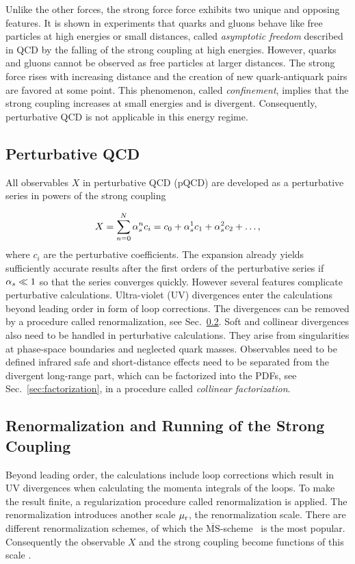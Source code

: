 Unlike the other forces, the strong force force exhibits two unique and opposing
features. It is shown in experiments that quarks and gluons behave like free
particles at high energies or small distances, called \emph{asymptotic freedom}
described in QCD by the falling of the strong coupling at high energies.
However, quarks and gluons cannot be observed as free particles at larger
distances. The strong force rises with increasing distance and the creation of
new quark-antiquark pairs are favored at some point. This phenomenon, called
\emph{confinement}, implies that the strong coupling increases at small energies
and is divergent. Consequently, perturbative QCD is not applicable in this
energy regime.

\subsection{Perturbative QCD}

All observables $X$ in perturbative QCD (pQCD) are developed as a
perturbative series in powers of the strong coupling \as

\begin{equation*}
    X = \sum_{n=0}^N \alpha_{s}^n c_i = c_0 + \alpha_{s}^1 c_1 + \alpha_{s}^2 c_2 + \ldots, 
\end{equation*}
%
where $c_i$ are the perturbative coefficients. The expansion already yields
sufficiently accurate results after the first orders of the perturbative series
if $\alpha_{s} \ll 1$ so that the series converges quickly. However several features
complicate perturbative calculations. Ultra-violet (UV) divergences enter the
calculations beyond leading order in form of loop corrections. The divergences
can be removed by a procedure called renormalization, see
Sec.~\ref{sec:renormalization}. Soft and collinear divergences also need to be
handled in perturbative calculations. They arise from singularities at
phase-space boundaries and neglected quark masses. Observables need to be
defined infrared safe and short-distance effects need to be separated from the
divergent long-range part, which can be factorized into the PDFs, see
Sec.~\ref{sec:factorization}, in a procedure called \emph{collinear
factorization}.

\subsection{Renormalization and Running of the Strong Coupling}
\label{sec:renormalization}

Beyond leading order, the calculations include loop corrections which result in
UV divergences when calculating the momenta integrals of the loops. To make the
result finite, a regularization procedure called renormalization is applied. The
renormalization introduces another scale $\mu_{\mathrm{r}}$, the renormalization scale.
There are different renormalization schemes, of which the
$\overline{\mathrm{MS}}$-scheme~\cite{Weinberg:1951ss,tHooft:1973mm} is the most
popular. Consequently the observable $X$ and the strong coupling become
functions of this scale \mur. 

